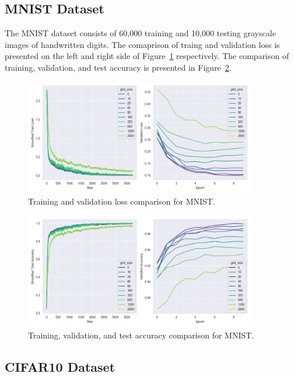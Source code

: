 \documentclass{article}
\begin{document}
\subsection{MNIST Dataset}\label{subsec:mnist}

The MNIST dataset consists of 60,000 training and 10,000 testing grayscale images of handwritten digits.
The comaprison of traing and validation loss is presented on the left and right side of Figure~\ref{fig:mnist_loss} respectively.
The comparison of training, validation, and test accuracy is presented in Figure~\ref{fig:mnist_accuracy}.


\begin{figure}[H]
    \centering
    \includegraphics[width=0.9\textwidth]{pics/mnist_loss}
    \caption{Training and validation loss comparison for MNIST.}
    \label{fig:mnist_loss}
\end{figure}

\begin{figure}[H]
    \centering
    \includegraphics[width=0.9\textwidth]{pics/mnist_accuracy}
    \caption{Training, validation, and test accuracy comparison for MNIST.}
    \label{fig:mnist_accuracy}
\end{figure}



\subsection{CIFAR10 Dataset}\label{subsec:cifar10}
\end{document}
